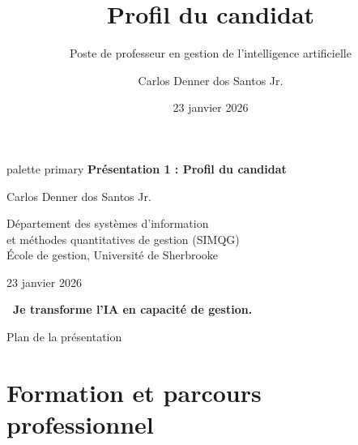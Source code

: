 \documentclass[aspectratio=169,11pt]{beamer}
\title[Profil du candidat]{Profil du candidat}
\subtitle{Poste de professeur en gestion de l'intelligence artificielle}
\author[C. D. dos Santos]{Carlos Denner dos Santos Jr.}
\institute[UdeS - SIMQG]{
  Département des systèmes d'information\\
  et méthodes quantitatives de gestion (SIMQG)\\
  École de gestion, Université de Sherbrooke
}
\date{23 janvier 2026}
\begin{document}
\begin{frame}
  \begin{beamercolorbox}[wd=\paperwidth,ht=2.5cm,dp=0.5cm,center]{palette primary}
    {\Large\bfseries Présentation 1 : Profil du candidat}
  \end{beamercolorbox}
  
  \vspace{0.8cm}
  
  \begin{center}
    {\Large Carlos Denner dos Santos Jr.}
    
    \vspace{0.8em}
    
    {\normalsize Département des systèmes d'information\\
    et méthodes quantitatives de gestion (SIMQG)\\
    École de gestion, Université de Sherbrooke}
    
    \vspace{0.8em}
    
    {\normalsize 23 janvier 2026}
    
    \vspace{1em}
    
    {\large\textcolor{ushervert}{\textbf{\guillemotleft~Je transforme l'IA en capacité de gestion.~\guillemotright}}}
  \end{center}
\end{frame}

\begin{frame}{Plan de la présentation}
  \tableofcontents
\end{frame}

\section{Formation et parcours professionnel}
\end{document}
